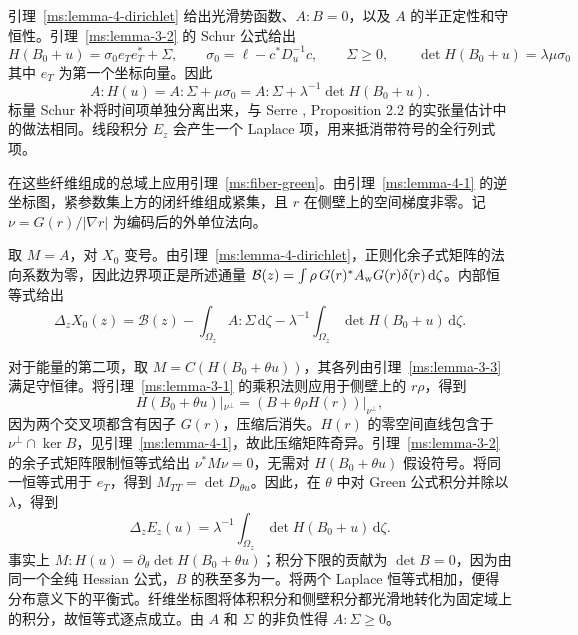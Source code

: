 引理~\ref{ms:lemma-4-dirichlet} 给出光滑势函数、$A:B=0$，以及 $A$ 的半正定性和守恒性。引理~\ref{ms:lemma-3-2} 的 Schur 公式给出
\[
 H(B_0+u)=\sigma_0 e_Te_T^*+\Sigma,\qquad
 \sigma_0=\ell-c^*D_u^{-1}c,\qquad \Sigma\ge0,\qquad
 \det H(B_0+u)=\lambda\mu\sigma_0
\]
其中 $e_T$ 为第一个坐标向量。因此
\[
 A:H(u)=A:\Sigma+\mu\sigma_0=A:\Sigma+\lambda^{-1}\det H(B_0+u).
\]
标量 Schur 补将时间项单独分离出来，与 Serre \cite{r-71}, Proposition 2.2 的实张量估计中的做法相同。线段积分 $E_z$ 会产生一个 Laplace 项，用来抵消带符号的全行列式项。

在这些纤维组成的总域上应用引理~\ref{ms:fiber-green}。由引理~\ref{ms:lemma-4-1} 的逆坐标图，紧参数集上方的闭纤维组成紧集，且 $r$ 在侧壁上的空间梯度非零。记 $\nu=G(r)/|\nabla r|$ 为编码后的外单位法向。

取 $M=A$，对 $X_0$ 变号。由引理~\ref{ms:lemma-4-dirichlet}，正则化余子式矩阵的法向系数为零，因此边界项正是所述通量 $\mathcal B(z)=\int\rho\,G(r)^*A_{\rm w}G(r)\delta(r)\,\mathrm d\zeta$。内部恒等式给出
\[
 \Delta_z X_0(z)=\mathcal B(z)-\int_{\Omega_z} A:\Sigma\,\mathrm d\zeta
 -\lambda^{-1}\int_{\Omega_z}\det H(B_0+u)\,\mathrm d\zeta .
\]

对于能量的第二项，取 $M=C(H(B_0+\theta u))$，其各列由引理~\ref{ms:lemma-3-3} 满足守恒律。将引理~\ref{ms:lemma-3-1} 的乘积法则应用于侧壁上的 $r\rho$，得到
\[
 H(B_0+\theta u)|_{\nu^\perp}=(B+\theta\rho H(r))|_{\nu^\perp},
\]
因为两个交叉项都含有因子 $G(r)$，压缩后消失。$H(r)$ 的零空间直线包含于 $\nu^\perp\cap\ker B$，见引理~\ref{ms:lemma-4-1}，故此压缩矩阵奇异。引理~\ref{ms:lemma-3-2} 的余子式矩阵限制恒等式给出 $\nu^*M\nu=0$，无需对 $H(B_0+\theta u)$ 假设符号。将同一恒等式用于 $e_T$，得到 $M_{TT}=\det D_{\theta u}$。因此，在 $\theta$ 中对 Green 公式积分并除以 $\lambda$，得到
\[
 \Delta_z E_z(u)=\lambda^{-1}\int_{\Omega_z}\det H(B_0+u)\,\mathrm d\zeta .
\]
事实上 $M:H(u)=\partial_\theta\det H(B_0+\theta u)$；积分下限的贡献为 $\det B=0$，因为由同一个全纯 Hessian 公式，$B$ 的秩至多为一。将两个 Laplace 恒等式相加，便得分布意义下的平衡式。纤维坐标图将体积积分和侧壁积分都光滑地转化为固定域上的积分，故恒等式逐点成立。由 $A$ 和 $\Sigma$ 的非负性得 $A:\Sigma\ge0$。
